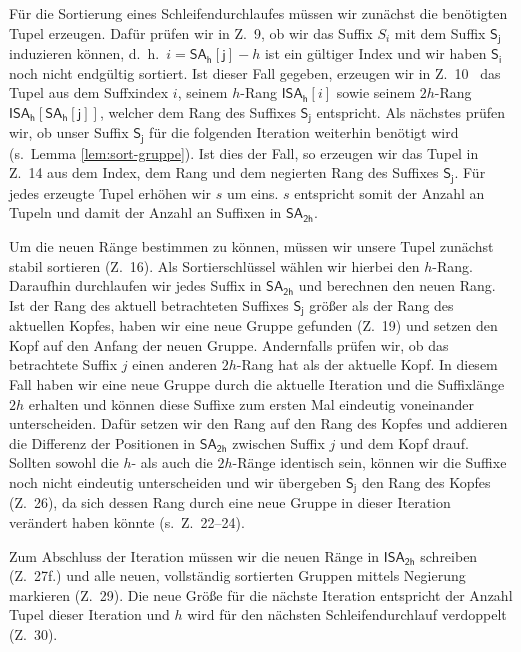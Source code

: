 Für die Sortierung eines Schleifendurchlaufes müssen wir zunächst die benötigten Tupel erzeugen. Dafür prüfen wir in Z.~9, ob wir das Suffix $S_i$ mit dem Suffix $\mathsf{S_j}$ induzieren können, d.~h.\ $i = \mathsf{SA_h[j]}-h$ ist ein gültiger Index und wir haben $\mathsf{S_i}$ noch nicht endgültig sortiert. Ist dieser Fall gegeben, erzeugen wir in Z.~10 \ das Tupel aus dem Suffxindex $i$, seinem $h$-Rang $\mathsf{ISA_h}[i]$ sowie seinem $2h$-Rang $\mathsf{ISA_h[SA_h[j]]}$, welcher dem Rang des Suffixes $\mathsf{S_j}$ entspricht. Als nächstes prüfen wir, ob unser Suffix $\mathsf{S_j}$ für die folgenden Iteration weiterhin benötigt wird (s.~Lemma \ref{lem:sort-gruppe}). Ist dies der Fall, so erzeugen wir das Tupel in Z.~14 aus dem Index, dem Rang und dem negierten Rang des Suffixes $\mathsf{S_j}$. Für jedes erzeugte Tupel erhöhen wir $s$ um eins. $s$ entspricht somit der Anzahl an Tupeln und damit der Anzahl an Suffixen in $\mathsf{SA_{2h}}$.

Um die neuen Ränge bestimmen zu können, müssen wir unsere Tupel zunächst stabil sortieren (Z.~16). Als Sortierschlüssel wählen wir hierbei den $h$-Rang. Daraufhin durchlaufen wir jedes Suffix in $\mathsf{SA_{2h}}$ und berechnen den neuen Rang. Ist der Rang des aktuell betrachteten Suffixes $\mathsf{S_j}$ größer als der Rang des aktuellen Kopfes, haben wir eine neue Gruppe gefunden (Z.~19) und setzen den Kopf auf den Anfang der neuen Gruppe. Andernfalls prüfen wir, ob das betrachtete Suffix $j$ einen anderen $2h$-Rang hat als der aktuelle Kopf. In diesem Fall haben wir eine neue Gruppe durch die aktuelle Iteration und die Suffixlänge $2h$ erhalten und können diese Suffixe zum ersten Mal eindeutig voneinander unterscheiden. Dafür setzen wir den Rang auf den Rang des Kopfes und addieren die Differenz der Positionen in $\mathsf{SA_{2h}}$ zwischen Suffix $j$ und dem Kopf drauf. Sollten sowohl die $h$- als auch die $2h$-Ränge identisch sein, können wir die Suffixe noch nicht eindeutig unterscheiden und wir übergeben $\mathsf{S_j}$ den Rang des Kopfes (Z.~26), da sich dessen Rang durch eine neue Gruppe in dieser Iteration verändert haben könnte (s.~Z.~22--24).

Zum Abschluss der Iteration müssen wir die neuen Ränge in $\mathsf{ISA_{2h}}$ schreiben (Z.~27f.) und alle neuen, vollständig sortierten Gruppen mittels Negierung markieren (Z.~29). Die neue Größe für die nächste Iteration entspricht der Anzahl Tupel dieser Iteration und $h$ wird für den nächsten Schleifendurchlauf verdoppelt (Z.~30).

